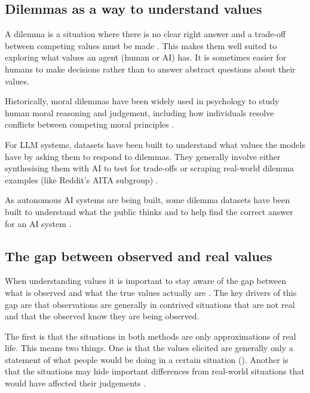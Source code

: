 \subsection{Dilemmas as a way to understand values}

A dilemma is a situation where there is no clear right answer and a trade-off between competing values must be made \cite{EthicalDilemmasOverview}. This makes them well suited to exploring what values an agent (human or AI) has. It is sometimes easier for humans to make decisions rather than to answer abstract questions about their values.

Historically, moral dilemmas have been widely used in psychology to study human moral reasoning and judgement, including how individuals resolve conflicts between competing moral principles \cite{rest1974manual,kohlbergDevelopmentChildrensOrientations1963,greeneFMRIInvestigationEmotional2001}.

For LLM systems, datasets have been built to understand what values the models have by asking them to respond to dilemmas. They generally involve either synthesising them with AI to test for trade-offs or scraping real-world dilemma examples (like Reddit's AITA subgroup) \cite{lourieScruplesCorpusCommunity2021,chiuDailyDilemmasRevealingValue2025,hendrycksAligningAIShared2023,scherrerEvaluatingMoralBeliefs2023,panRewardsJustifyMeans2023}.

As autonomous AI systems are being built, some dilemma datasets have been built to understand what the public thinks and to help find the correct answer for an AI system \cite{awadMoralMachineExperiment2018}.

\subsection{The gap between observed and real values}

When understanding values it is important to stay aware of the gap between what is observed and what the true values actually are \cite{brunswikPerceptionRepresentativeDesign1956,podsakoffCommonMethodBiases2003}. The key drivers of this gap are that observations are generally in contrived situations that are not real and that the observed know they are being observed.

The first is that the situations in both methods are only approximations of real life. This means two things. One is that the values elicited are generally only a statement of what people would be doing in a certain situation ()\cite{kollmussMindGapWhy2002,shenMindValueActionGap2025}. Another is that the situations may hide important differences from real-world situations that would have affected their judgements \cite{schumanQuestionsAnswersAttitude1996,tourangeauCognitiveProcessesUnderlying1988,webbUnobtrusiveMeasures2000}.


